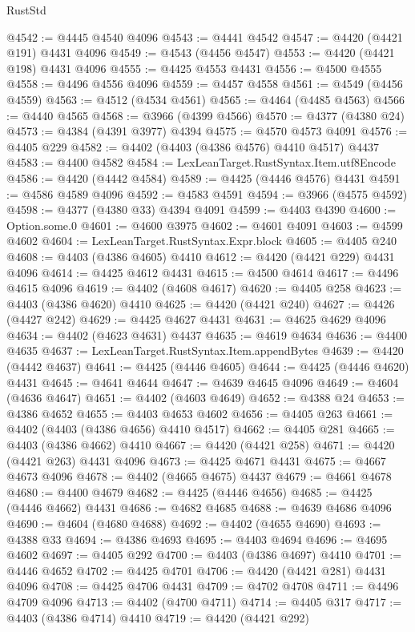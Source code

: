 \begin{lexlean}{RustStd}
\begin{coremodule}
@4542 := @4445 @4540 @4096
@4543 := @4441 @4542
@4547 := @4420 (@4421 @191) @4431 @4096
@4549 := @4543 (@4456 @4547)
@4553 := @4420 (@4421 @198) @4431 @4096
@4555 := @4425 @4553 @4431
@4556 := @4500 @4555
@4558 := @4496 @4556 @4096
@4559 := @4457 @4558
@4561 := @4549 (@4456 @4559)
@4563 := @4512 (@4534 @4561)
@4565 := @4464 (@4485 @4563)
@4566 := @4440 @4565
@4568 := @3966 (@4399 @4566)
@4570 := @4377 (@4380 @24)
@4573 := @4384 (@4391 @3977) @4394
@4575 := @4570 @4573 @4091
@4576 := @4405 @229
@4582 := @4402 (@4403 (@4386 @4576) @4410 @4517) @4437
@4583 := @4400 @4582
@4584 := LexLeanTarget.RustSyntax.Item.utf8Encode
@4586 := @4420 (@4442 @4584)
@4589 := @4425 (@4446 @4576) @4431
@4591 := @4586 @4589 @4096
@4592 := @4583 @4591
@4594 := @3966 (@4575 @4592)
@4598 := @4377 (@4380 @33) @4394 @4091
@4599 := @4403 @4390
@4600 := Option.some.{0}
@4601 := @4600 @3975
@4602 := @4601 @4091
@4603 := @4599 @4602
@4604 := LexLeanTarget.RustSyntax.Expr.block
@4605 := @4405 @240
@4608 := @4403 (@4386 @4605) @4410
@4612 := @4420 (@4421 @229) @4431 @4096
@4614 := @4425 @4612 @4431
@4615 := @4500 @4614
@4617 := @4496 @4615 @4096
@4619 := @4402 (@4608 @4617)
@4620 := @4405 @258
@4623 := @4403 (@4386 @4620) @4410
@4625 := @4420 (@4421 @240)
@4627 := @4426 (@4427 @242)
@4629 := @4425 @4627 @4431
@4631 := @4625 @4629 @4096
@4634 := @4402 (@4623 @4631) @4437
@4635 := @4619 @4634
@4636 := @4400 @4635
@4637 := LexLeanTarget.RustSyntax.Item.appendBytes
@4639 := @4420 (@4442 @4637)
@4641 := @4425 (@4446 @4605)
@4644 := @4425 (@4446 @4620) @4431
@4645 := @4641 @4644
@4647 := @4639 @4645 @4096
@4649 := @4604 (@4636 @4647)
@4651 := @4402 (@4603 @4649)
@4652 := @4388 @24
@4653 := @4386 @4652
@4655 := @4403 @4653 @4602
@4656 := @4405 @263
@4661 := @4402 (@4403 (@4386 @4656) @4410 @4517)
@4662 := @4405 @281
@4665 := @4403 (@4386 @4662) @4410
@4667 := @4420 (@4421 @258)
@4671 := @4420 (@4421 @263) @4431 @4096
@4673 := @4425 @4671 @4431
@4675 := @4667 @4673 @4096
@4678 := @4402 (@4665 @4675) @4437
@4679 := @4661 @4678
@4680 := @4400 @4679
@4682 := @4425 (@4446 @4656)
@4685 := @4425 (@4446 @4662) @4431
@4686 := @4682 @4685
@4688 := @4639 @4686 @4096
@4690 := @4604 (@4680 @4688)
@4692 := @4402 (@4655 @4690)
@4693 := @4388 @33
@4694 := @4386 @4693
@4695 := @4403 @4694
@4696 := @4695 @4602
@4697 := @4405 @292
@4700 := @4403 (@4386 @4697) @4410
@4701 := @4446 @4652
@4702 := @4425 @4701
@4706 := @4420 (@4421 @281) @4431 @4096
@4708 := @4425 @4706 @4431
@4709 := @4702 @4708
@4711 := @4496 @4709 @4096
@4713 := @4402 (@4700 @4711)
@4714 := @4405 @317
@4717 := @4403 (@4386 @4714) @4410
@4719 := @4420 (@4421 @292)

\end{coremodule}
\end{lexlean}
